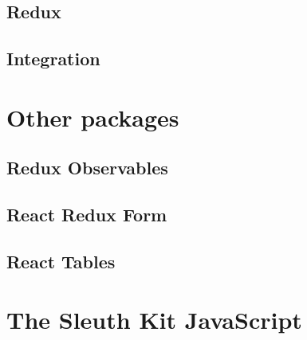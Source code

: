 \subsection{Redux}

\subsection{Integration}

\section{Other packages}

\subsection{Redux Observables}

\subsection{React Redux Form}

\subsection{React Tables}

\section{The Sleuth Kit JavaScript}

